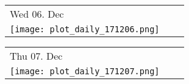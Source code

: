 \newpage

\begin{tabularx}{\linewidth}{YYY}
Wed 06. Dec\\
\texttt{[image: plot\_daily\_171206.png]}
\end{tabularx}

\begin{tabularx}{\linewidth}{YYY}
Thu 07. Dec\\
\texttt{[image: plot\_daily\_171207.png]}
\end{tabularx}

